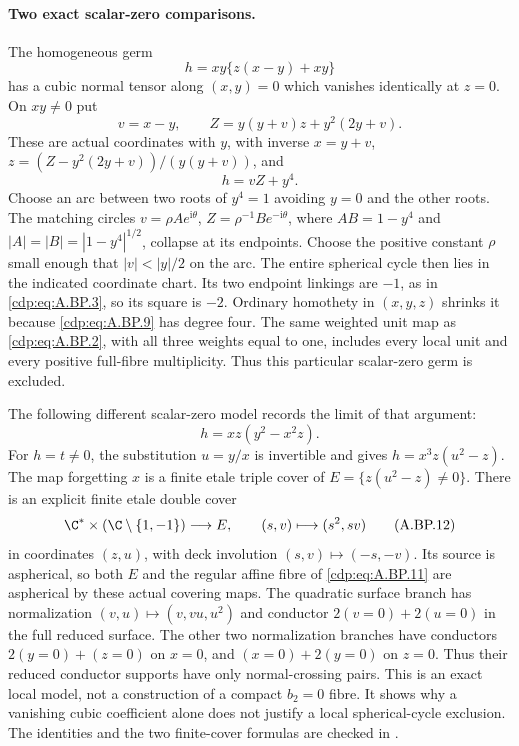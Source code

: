 \paragraph{Two exact scalar-zero comparisons.}
The homogeneous germ
\[
                  h=xy\{z(x-y)+xy\}
\tag{A.BP.9}\label{cdp:eq:A.BP.9}
\]
has a cubic normal tensor along $(x,y)=0$ which
vanishes identically at $z=0$. On $xy\ne0$ put
\[
 v=x-y,\qquad Z=y(y+v)z+y^2(2y+v).
\]
These are actual coordinates with $y$, with inverse
$x=y+v$, $z=(Z-y^2(2y+v))/(y(y+v))$, and
\[
                              h=vZ+y^4.
\tag{A.BP.10}\label{cdp:eq:A.BP.10}
\]
Choose an arc between two roots of $y^4=1$ avoiding
$y=0$ and the other roots. The matching circles
$v=\rho A e^{\mathrm i\theta}$,
$Z=\rho^{-1}B e^{-\mathrm i\theta}$, where
$AB=1-y^4$ and $|A|=|B|=|1-y^4|^{1/2}$,
collapse at its endpoints. Choose the positive
constant $\rho$ small enough that $|v|<|y|/2$
on the arc. The entire spherical cycle then lies
in the indicated coordinate chart. Its two endpoint
linkings are $-1$, as in \eqref{cdp:eq:A.BP.3}, so its square
is $-2$. Ordinary homothety in $(x,y,z)$ shrinks
it because \eqref{cdp:eq:A.BP.9} has degree four. The same
weighted unit map as \eqref{cdp:eq:A.BP.2}, with all three
weights equal to one, includes every local unit
and every positive full-fibre multiplicity.
Thus this particular scalar-zero germ is excluded.

The following different scalar-zero model records
the limit of that argument:
\[
                     h=xz(y^2-x^2z).
\tag{A.BP.11}\label{cdp:eq:A.BP.11}
\]
For $h=t\ne0$, the substitution $u=y/x$ is
invertible and gives $h=x^3 z(u^2-z)$.
The map forgetting $x$ is a finite etale triple
cover of $E=\{z(u^2-z)\ne0\}$.
There is an explicit finite etale double cover
\[
 \C^*\times(\C\setminus\{1,-1\})\longrightarrow E,
                  \qquad(s,v)\longmapsto(s^2,sv)
\tag{A.BP.12}\label{cdp:eq:A.BP.12}
\]
in coordinates $(z,u)$, with deck involution
$(s,v)\mapsto(-s,-v)$. Its source is aspherical,
so both $E$ and the regular affine fibre of
\eqref{cdp:eq:A.BP.11} are aspherical by these actual covering
maps. The quadratic surface branch has normalization
$(v,u)\mapsto(v,vu,u^2)$ and conductor
$2(v=0)+2(u=0)$ in the full reduced surface.
The other two normalization branches have conductors
$2(y=0)+(z=0)$ on $x=0$, and
$(x=0)+2(y=0)$ on $z=0$.
Thus their reduced conductor supports have only
normal-crossing pairs. This is an exact local
model, not a construction of a compact $b_2=0$
fibre. It shows why a vanishing cubic coefficient
alone does not justify a local spherical-cycle
exclusion. The identities and the two finite-cover
formulas are checked in .

